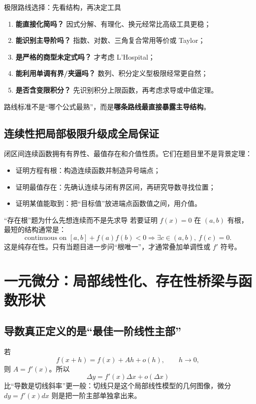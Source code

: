\documentclass[11pt,a4paper,openany]{ctexbook}
\newcommand{\key}[1]{\textbf{\color{deep}#1}}
\begin{document}
\begin{methodbox}{极限路线选择：先看结构，再决定工具}
\begin{enumerate}
  \item \key{能直接化简吗？} 因式分解、有理化、换元经常比高级工具更稳；
  \item \key{能识别主导阶吗？} 指数、对数、三角复合常用等价或 Taylor；
  \item \key{是严格的商型未定式吗？} 才考虑 L'Hospital；
  \item \key{能利用单调有界/夹逼吗？} 数列、积分定义型极限经常更自然；
  \item \key{是否含变限积分？} 先识别积分上限函数，再考虑求导或中值定理。
\end{enumerate}
路线标准不是“哪个公式最熟”，而是\key{哪条路线最直接暴露主导结构}。
\end{methodbox}

\section{连续性把局部极限升级成全局保证}
闭区间连续函数拥有有界性、最值存在和介值性质。它们在题目里不是背景定理：
\begin{itemize}
  \item 证明方程有根：构造连续函数并制造异号端点；
  \item 证明最值存在：先确认连续与闭有界区间，再研究导数寻找位置；
  \item 证明某值能取到：把“目标值”放进端点函数值之间，用介值。
\end{itemize}

\begin{examplebox}{“存在根”题为什么先想连续而不是先求导}
若要证明 $f(x)=0$ 在 $(a,b)$ 有根，最短的结构通常是：
\[
\text{continuous on }[a,b]+f(a)f(b)<0\Longrightarrow \exists c\in(a,b),\ f(c)=0.
\]
这是纯存在性。只有当题目进一步问“根唯一”，才通常叠加单调性或 $f'$ 符号。
\end{examplebox}

\chapter{一元微分：局部线性化、存在性桥梁与函数形状}

\section{导数真正定义的是“最佳一阶线性主部”}
若
\[
f(x+h)=f(x)+Ah+o(h),\qquad h\to0,
\]
则 $A=f'(x)$。所以
\[
\boxed{\Delta y=f'(x)\Delta x+o(\Delta x)}
\]
比“导数是切线斜率”更一般：切线只是这个局部线性模型的几何图像，微分 $dy=f'(x)dx$ 则是把一阶主部单独拿出来。
\end{document}
